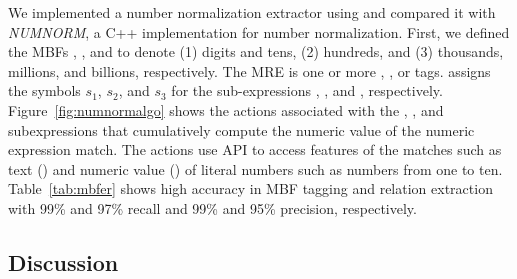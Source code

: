 We implemented a number normalization extractor using \framework and 
compared it with {\em NUMNORM}, a 
C++ implementation for number normalization. 
First, we defined the MBFs , , and 
to denote (1) digits and tens, (2) hundreds, and (3) 
thousands, millions, and billions, respectively.
The  MRE 
 is one or more , , or  tags. 
\framework assigns the symbols $s_1$, $s_2$, and $s_3$ 
for the sub-expressions , , and , respectively. 
Figure~\ref{fig:numnormalgo} shows the actions associated with the , , and  subexpressions that cumulatively compute the numeric value of the numeric expression match.
The actions use \framework API to access features of the matches such 
as text () and numeric 
value () of literal numbers such as numbers from one to ten.
%
Table~\ref{tab:mbfer} shows high accuracy in MBF tagging and relation extraction 
with 99\% and 97\% recall and 99\% and 95\% precision, respectively. 

\vspace{-1.5em}
\subsection{Discussion}
\label{subsec:discuss}
\label{sec:discuss}

